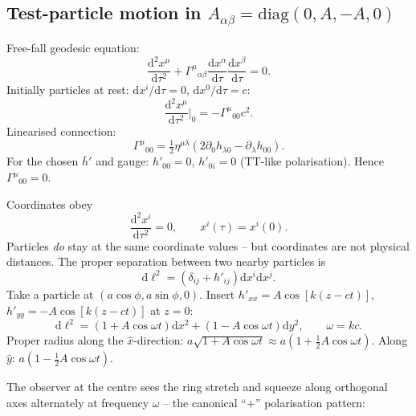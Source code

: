 \documentclass[11pt]{article}
\newcommand{\de}{\mathrm{d}}
\begin{document}
\subsection*{Test-particle motion in $A_{\alpha\beta}=\mathrm{diag}(0,A,-A,0)$}

Free-fall geodesic equation:
\[ \frac{\de^{2}x^{\mu}}{\de\tau^{2}} + \Gamma^{\mu}{}_{\alpha\beta}\frac{\de x^{\alpha}}{\de\tau}\frac{\de x^{\beta}}{\de\tau} = 0. \]
Initially particles at rest: $\de x^{i}/\de\tau=0$, $\de x^{0}/\de\tau=c$:
\[ \frac{\de^{2}x^{\mu}}{\de\tau^{2}}\Big|_{0} = -\Gamma^{\mu}{}_{00}c^{2}. \]
Linearised connection:
\[ \Gamma^{\mu}{}_{00} = \tfrac12\eta^{\mu\lambda}(2\partial_{0}h_{\lambda 0}-\partial_{\lambda}h_{00}). \]
For the chosen $\bar h'$ and gauge: $h'_{00}=0$, $h'_{0i}=0$ (TT-like polarisation). Hence $\Gamma^{\mu}{}_{00}=0$.

Coordinates obey
\[ \boxed{\;\frac{\de^{2}x^{i}}{\de\tau^{2}}=0,\qquad x^{i}(\tau)=x^{i}(0).\;} \]
Particles \emph{do} stay at the same coordinate values -- but coordinates are not physical distances. The proper separation between two nearby particles is
\[ \de\ell^{2} = (\delta_{ij}+h'_{ij})\de x^{i}\de x^{j}. \]
Take a particle at $(a\cos\phi,a\sin\phi,0)$. Insert $h'_{xx}=A\cos[k(z-ct)]$, $h'_{yy}=-A\cos[k(z-ct)]$ at $z=0$:
\[ \de\ell^{2} = (1+A\cos\omega t)\de x^{2} + (1-A\cos\omega t)\de y^{2},\qquad \omega=kc. \]
Proper radius along the $\hat x$-direction: $a\sqrt{1+A\cos\omega t}\approx a(1+\tfrac12 A\cos\omega t)$. Along $\hat y$: $a(1-\tfrac12 A\cos\omega t)$.

The observer at the centre sees the ring stretch and squeeze along orthogonal axes alternately at frequency $\omega$ -- the canonical ``$+$'' polarisation pattern:

\begin{center}
\end{center}
\end{document}
